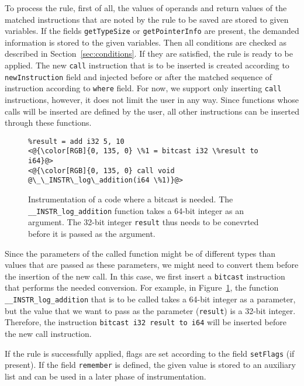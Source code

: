 To process the rule, first of all, the values of operands and return values of
the matched instructions that are noted by the rule to be saved are stored to
given variables. If the fields \texttt{getTypeSize} or \texttt{getPointerInfo}
are present, the demanded information is stored to the given variables. Then
all conditions are checked as described in Section~\ref{sec:conditions}. If
they are satisfied, the rule is ready to be applied. The new \texttt{call}
instruction that is to be inserted is created according to
\texttt{newInstruction} field and injected before or after the matched sequence
of instruction according to \texttt{where} field. For now, we support only
inserting \texttt{call} instructions, however, it does not limit the user in
any way. Since functions whose calls will be inserted are defined by the user,
all other instructions can be inserted through these functions.

\begin{figure}[h]
\begin{lstlisting}
%result = add i32 5, 10
<@{\color[RGB]{0, 135, 0} \%1 = bitcast i32 \%result to i64}@>
<@{\color[RGB]{0, 135, 0} call void @\_\_INSTR\_log\_addition(i64 \%1)}@>
\end{lstlisting}
\caption{Instrumentation of a code where a bitcast is needed. The
\texttt{\_\_INSTR\_log\_addition} function takes a 64-bit integer as an
argument. The 32-bit integer \texttt{result} thus needs to be conevrted before
it is passed as the argument.}
\label{fig:bitcast_example}
\end{figure}
Since the parameters of the called function might be of different types than
values that are passed as these parameters, we might need to convert them
before the insertion of the new call. In this case, we first insert a
\texttt{bitcast} instruction that performs the needed conversion. For example,
in Figure~\ref{fig:bitcast_example}, the function
\texttt{\_\_INSTR\_log\_addition} that is to be called takes a 64-bit integer
as a parameter, but the value that we want to pass as the parameter
(\texttt{result}) is a 32-bit integer. Therefore, the instruction \texttt{bitcast
i32 result to i64} will be inserted before the new call instruction.

If the rule is successfully applied, flags are set according to the field
\texttt{setFlags} (if present). If the field \texttt{remember} is defined, the
given value is stored to an auxiliary list and can be used in a later phase of
instrumentation.

